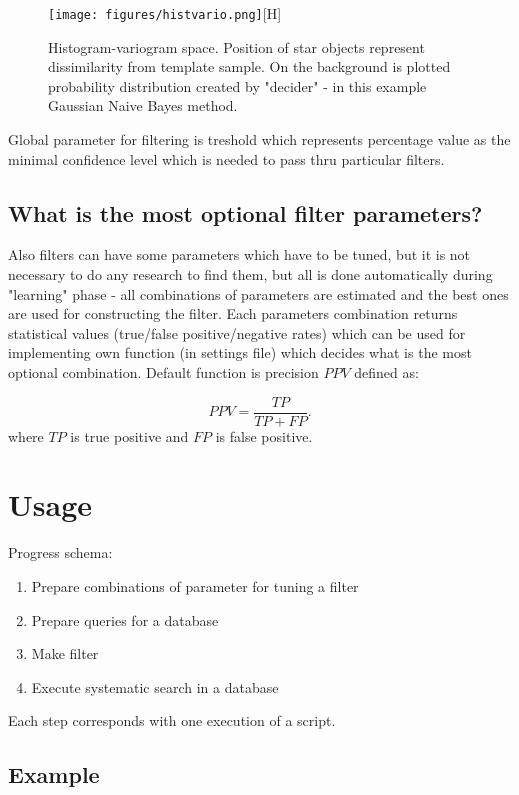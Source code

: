 \documentclass[final,5p,times,twocolumn,authoryear]{elsarticle}
\begin{document}
\begin{figure}
\label{histvario}
\texttt{[image: figures/histvario.png]}[H]
\caption{Histogram-variogram space. Position of star objects represent dissimilarity from template sample. On the background is plotted probability distribution created by "decider" - in this example Gaussian Naive Bayes method.}
\end{figure}


Global parameter for filtering is treshold which represents percentage value as the minimal confidence level which is needed to pass thru particular filters.


\subsection{What is the most optional filter parameters?}
Also filters can have some parameters which have to be tuned, but it is not necessary to do any research to find them, but all is done automatically during "learning" phase - all combinations of parameters are estimated and the best ones are used for constructing the filter. Each parameters combination returns statistical values (true/false positive/negative rates) which can be used for implementing own function (in settings file) which decides what is the most optional combination. Default function is precision $PPV$ defined as:

\begin{equation}
PPV = \frac{TP}{TP + FP }.
\end{equation}
%
where $TP$ is true positive and $FP$ is false positive.

\section{Usage}

Progress schema:

\begin{enumerate}
\item Prepare combinations of parameter for tuning a filter
\item Prepare queries for a database
\item Make filter
\item Execute systematic search in a database
\end{enumerate}
%
Each step corresponds with one execution of a script.

\subsection{ Example }
\end{document}
